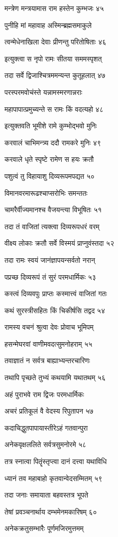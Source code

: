 मन्त्रेण मन्त्रयामास राम हस्तेन कुम्भजः ४५

पुनीहि मां महावाह अस्मिन्ब्रह्मसमाकुले

त्वन्मेधेनाखिला देवाः प्रीणन्तु परितोषिताः ४६

इत्युक्त्वा स नृपो रामः सीतया सममस्पृशत्

तदा सर्वे द्विजाश्चित्रममन्यन्त कुतूहलात् ४७

परस्परमवोचंस्ते यन्नामस्मरणान्नराः

महापापात्प्रमुच्यन्ते स रामः किं वदत्यहो ४८

इत्युक्तवति भूमीशे रामे कुम्भोद्भवो मुनिः

करवालं चाभिमन्त्र्य ददौ रामकरे मुनिः ४९

करवाले धृते स्पृष्टे रामेण स हयः क्रतौ

पशुत्वं तु विहायाशु दिव्यरूपमपद्यत ५०

विमानवरमारूढश्चाप्सरोभिः समन्ततः

चामरैर्वीज्यमानश्च वैजयन्त्या विभूषितः ५१

तदा तं वाजितां त्यक्त्वा दिव्यरूपधरं वरम्

वीक्ष्य लोकाः क्रतौ सर्वे विस्मयं प्राप्नुवंस्तदा ५२

तदा रामः स्वयं जानंज्ञापयन्सर्वतो नरान्

पप्रच्छ दिव्यरूपं तं सुरं परमधार्मिकः ५३

कस्त्वं दिव्यवपुः प्राप्तः कस्मात्त्वं वाजितां गतः

कथं सुरस्त्रीसहितः किं चिकीर्षसि तद्वद ५४

रामस्य वचनं श्रुत्वा देवः प्रोवाच भूमिपम्

हसन्मेघरवां वाणीमवदत्सुमनोहराम् ५५

तवाज्ञातं न सर्वत्र बाह्याभ्यन्तरचारिणः

तथापि पृच्छते तुभ्यं कथयामि यथातथम् ५६

अहं पुराभवे राम द्विजः परमधार्मिकः

अचरं प्रतिकूलं वै वेदस्य रिपुतापन ५७

कदाचिद्धुतपापायास्तीरेऽहं गतवान्पुरा

अनेकवृक्षललिते सर्वत्रसुमनोरमे ५८

तत्र स्नात्वा पितॄंस्तृप्त्वा दानं दत्त्वा यथाविधि

ध्यानं तव महाबाहो कृतवान्वेदसम्मितम् ५९

तदा जनाः समायाता बहवस्तत्र भूपते

तेषां प्रवञ्चनार्थाय दम्भमेनमकारिषम् ६०

अनेकक्रतुसम्भारैः पूर्णमजिरमुत्तमम्

